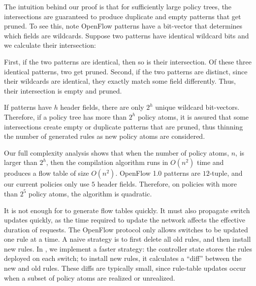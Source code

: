 The intuition behind our proof is that for sufficiently large policy trees,
the intersections are guaranteed to produce
duplicate and empty patterns that get pruned. To see this,
note OpenFlow patterns have a bit-vector that determines which fields
are wildcards.  Suppose two patterns have identical wildcard bits and
we calculate their intersection:

First, if the two patterns are identical, then so is their
  intersection. Of these three identical patterns, two get pruned.
Second, if the two patterns are distinct, since their wildcards are
  identical, they exactly match some field differently. Thus, their
  intersection is empty and pruned.

If patterns have $h$ header fields, there are only $2^h$ unique
wildcard bit-vectors. Therefore, if a policy tree has more than $2^h$
policy atoms, it is assured that some intersections create empty or duplicate
patterns that are pruned, thus thinning the number of generated rules
as new policy atoms are considered.

Our full complexity analysis shows that when the
number of policy atoms, $n$, is larger than $2^h$, then the
compilation algorithm runs in $O(n^2)$ time and produces a flow table
of size $O(n^2)$. OpenFlow 1.0 patterns are $12$-tuple, and our current
policies
only use $5$ header fields. Therefore, on policies
with more than $2^5$ policy atoms, the algorithm is quadratic.


It is not enough for \sys to generate flow tables quickly. It must
also propagate switch updates quickly, as the time required to update
the network affects the effective duration of requests.
The OpenFlow protocol only allows switches to be updated one rule at a
time.  A naive strategy is to first delete all old rules, and then
install new rules. In \sys, we implement a faster strategy: the
controller state stores the rules deployed on each switch; to install
new rules, it calculates a ``diff'' between the new and old
rules. These diffs are typically small, since rule-table updates occur
when a subset of policy atoms are realized or unrealized.


